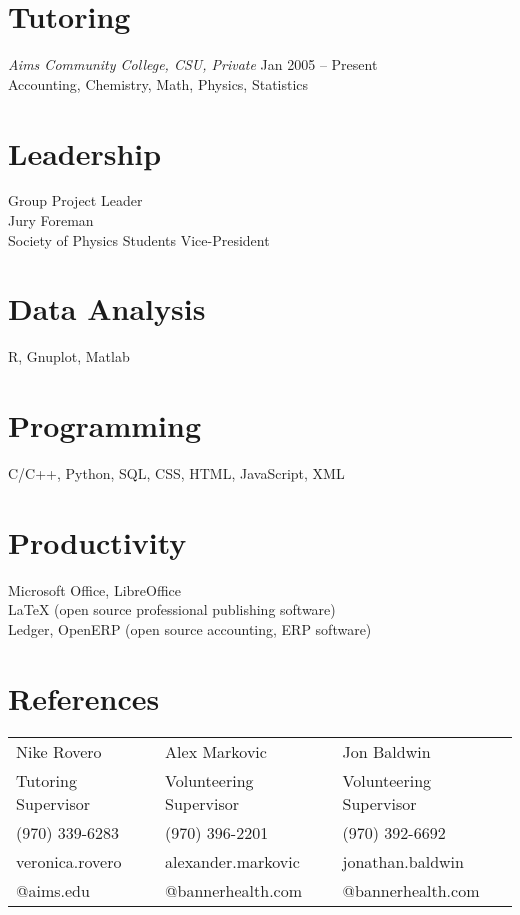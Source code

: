 \documentclass[margin]{res}
\begin{document}
\begin{resume}
\section{Tutoring}
{\sl Aims Community College, CSU, Private} \hfill Jan 2005 -- Present\\
Accounting, Chemistry, Math, Physics, Statistics

\section{Leadership}
Group Project Leader\\
Jury Foreman\\
Society of Physics Students Vice-President

\section{Data Analysis}
R, Gnuplot, Matlab

\section{Programming}
C/C++, Python, SQL, CSS, HTML, JavaScript, XML

\section{Productivity}
Microsoft Office, LibreOffice\\
LaTeX (open source professional publishing software)\\
Ledger, OpenERP (open source accounting, ERP software)

\section{References}
\hskip-0.08in
\begin{tabular}{lll}
Nike Rovero         & Alex Markovic            & Jon Baldwin             \\
Tutoring Supervisor & Volunteering Supervisor  & Volunteering Supervisor \\
(970) 339-6283      & (970) 396-2201           & (970) 392-6692          \\
veronica.rovero     & alexander.markovic       & jonathan.baldwin        \\
@aims.edu           & @bannerhealth.com        & @bannerhealth.com       
\end{tabular}

\end{resume}
\end{document}
